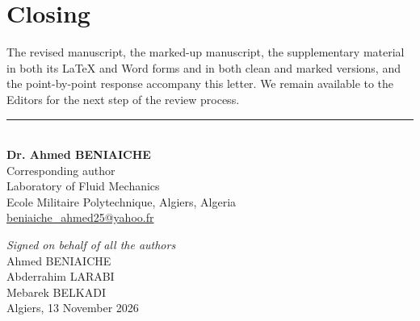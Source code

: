 \documentclass[11pt,a4paper]{article}
\begin{document}
\section*{Closing}

The revised manuscript, the marked-up manuscript, the supplementary material in
both its \LaTeX{} and Word forms and in both clean and marked versions, and the
point-by-point response accompany this letter. We
remain available to the Editors for the next step of the review process.

\vspace{1.0em}

\begin{minipage}[t]{0.52\linewidth}
\rule{6.2cm}{0.4pt}\\[2pt]
\textbf{Dr. Ahmed BENIAICHE}\\
Corresponding author\\
Laboratory of Fluid Mechanics\\
Ecole Militaire Polytechnique, Algiers, Algeria\\
\href{mailto:beniaiche_ahmed25@yahoo.fr}{beniaiche\_ahmed25@yahoo.fr}
\end{minipage}\hfill
\begin{minipage}[t]{0.42\linewidth}
\raggedleft
\textit{Signed on behalf of all the authors}\\[4pt]
Ahmed BENIAICHE\\
Abderrahim LARABI\\
Mebarek BELKADI\\[6pt]
Algiers, 13 November 2026
\end{minipage}
\end{document}
